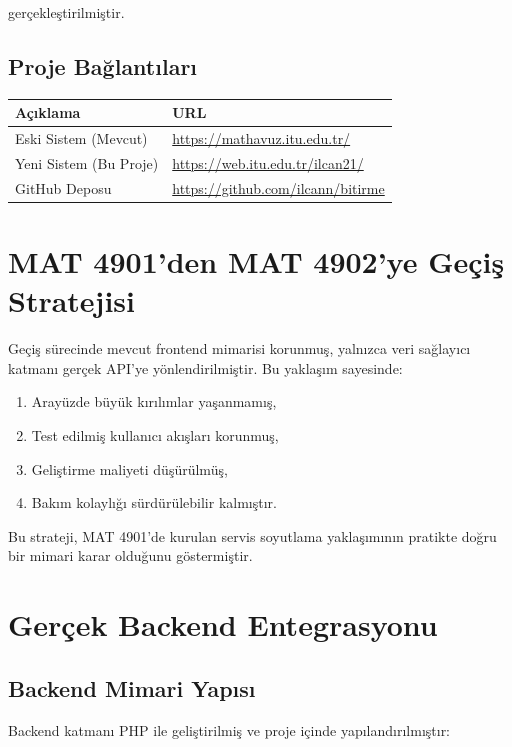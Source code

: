 \documentclass[12pt,a4paper]{article}
\begin{document}
gerçekleştirilmiştir.

\subsection{Proje Bağlantıları}

\begin{table}[H]
\centering
\begin{tabular}{@{}ll@{}}
\toprule
\textbf{Açıklama} & \textbf{URL} \\
\midrule
Eski Sistem (Mevcut) & \url{https://mathavuz.itu.edu.tr/} \\
Yeni Sistem (Bu Proje) & \url{https://web.itu.edu.tr/ilcan21/} \\
GitHub Deposu & \url{https://github.com/ilcann/bitirme} \\
\bottomrule
\end{tabular}
\end{table}

\section{MAT 4901'den MAT 4902'ye Geçiş Stratejisi}
Geçiş sürecinde mevcut frontend mimarisi korunmuş, yalnızca veri sağlayıcı katmanı gerçek API'ye yönlendirilmiştir. Bu yaklaşım sayesinde:

\begin{enumerate}[leftmargin=*]
    \item Arayüzde büyük kırılımlar yaşanmamış,
    \item Test edilmiş kullanıcı akışları korunmuş,
    \item Geliştirme maliyeti düşürülmüş,
    \item Bakım kolaylığı sürdürülebilir kalmıştır.
\end{enumerate}

Bu strateji, MAT 4901'de kurulan servis soyutlama yaklaşımının pratikte doğru bir mimari karar olduğunu göstermiştir.

\section{Gerçek Backend Entegrasyonu}

\subsection{Backend Mimari Yapısı}
Backend katmanı PHP ile geliştirilmiş ve proje içinde yapılandırılmıştır:
\end{document}
